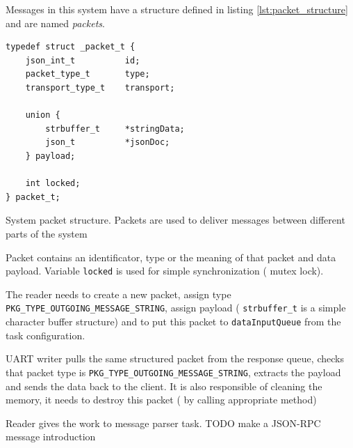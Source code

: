 Messages in this system have a structure defined in listing 
\ref{lst:packet_structure} and are named \textit{packets}.

\begin{listing}[H]
\begin{verbatim}
typedef struct _packet_t {
	json_int_t			id;
	packet_type_t		type;
	transport_type_t 	transport;
	
	union {
		strbuffer_t		*stringData;
		json_t			*jsonDoc;
	} payload;
	
	int locked;
} packet_t;
\end{verbatim}
\caption{System packet structure. Packets are used to deliver messages between
different parts of the system}
\label{lst:packet_structure}
\end{listing}

Packet contains an identificator, type or the meaning of that packet  and data
payload. Variable \texttt{locked} is used for simple synchronization ( mutex
lock).

The reader needs to create a new packet, assign type
\texttt{PKG\_TYPE\_OUTGOING\_MESSAGE\_STRING}, assign payload (
\texttt{strbuffer\_t} is a simple character buffer structure) and to put this
packet to \texttt{dataInputQueue} from the task configuration.

UART writer pulls the same structured packet from the response queue, checks
that packet type is \texttt{PKG\_TYPE\_OUTGOING\_MESSAGE\_STRING}, extracts the
payload and sends the data back to the client. It is also responsible of
cleaning the memory, it needs to destroy this packet ( by calling appropriate
method)

Reader gives the work to message parser task.
TODO make a JSON-RPC message introduction


% 
% 


